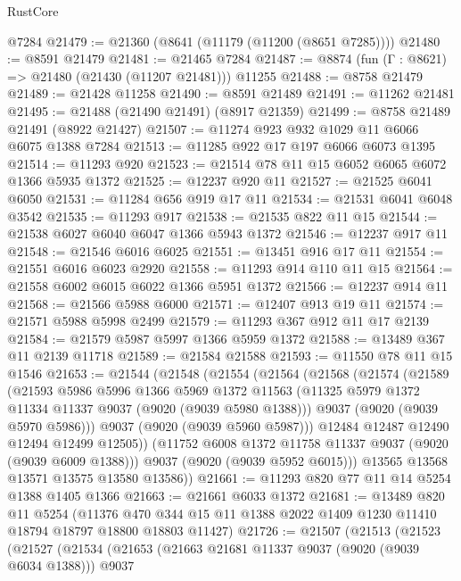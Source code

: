 \begin{lexlean}{RustCore}
\begin{coremodule}
    @7284
@21479 := @21360 (@8641 (@11179 (@11200 (@8651 @7285))))
@21480 := @8591 @21479
@21481 := @21465 @7284
@21487 := @8874 (fun (Γ : @8621) => @21480 (@21430 (@11207 @21481))) @11255
@21488 := @8758 @21479
@21489 := @21428 @11258
@21490 := @8591 @21489
@21491 := @11262 @21481
@21495 := @21488 (@21490 @21491) (@8917 @21359)
@21499 := @8758 @21489 @21491 (@8922 @21427)
@21507 := @11274 @923 @932 @1029 @11 @6066 @6075 @1388 @7284
@21513 := @11285 @922 @17 @197 @6066 @6073 @1395
@21514 := @11293 @920
@21523 := @21514 @78 @11 @15 @6052 @6065 @6072 @1366 @5935 @1372
@21525 := @12237 @920 @11
@21527 := @21525 @6041 @6050
@21531 := @11284 @656 @919 @17 @11
@21534 := @21531 @6041 @6048 @3542
@21535 := @11293 @917
@21538 := @21535 @822 @11 @15
@21544 := @21538 @6027 @6040 @6047 @1366 @5943 @1372
@21546 := @12237 @917 @11
@21548 := @21546 @6016 @6025
@21551 := @13451 @916 @17 @11
@21554 := @21551 @6016 @6023 @2920
@21558 := @11293 @914 @110 @11 @15
@21564 := @21558 @6002 @6015 @6022 @1366 @5951 @1372
@21566 := @12237 @914 @11
@21568 := @21566 @5988 @6000
@21571 := @12407 @913 @19 @11
@21574 := @21571 @5988 @5998 @2499
@21579 := @11293 @367 @912 @11 @17 @2139
@21584 := @21579 @5987 @5997 @1366 @5959 @1372
@21588 := @13489 @367 @11 @2139 @11718
@21589 := @21584 @21588
@21593 := @11550 @78 @11 @15 @1546
@21653 := @21544
    (@21548
      (@21554
        (@21564
          (@21568
            (@21574
              (@21589
                (@21593
                  @5986
                  @5996
                  @1366
                  @5969
                  @1372
                  @11563
                  (@11325 @5979 @1372 @11334 @11337 @9037 (@9020 (@9039 @5980 @1388)))
                  @9037
                  (@9020 (@9039 @5970 @5986)))
                @9037
                (@9020 (@9039 @5960 @5987)))
              @12484
              @12487
              @12490
              @12494
              @12499
              @12505))
          (@11752 @6008 @1372 @11758 @11337 @9037 (@9020 (@9039 @6009 @1388)))
          @9037
          (@9020 (@9039 @5952 @6015)))
        @13565
        @13568
        @13571
        @13575
        @13580
        @13586))
@21661 := @11293 @820 @77 @11 @14 @5254 @1388 @1405 @1366
@21663 := @21661 @6033 @1372
@21681 := @13489
    @820
    @11
    @5254
    (@11376 @470 @344 @15 @11 @1388 @2022 @1409 @1230 @11410 @18794 @18797 @18800 @18803 @11427)
@21726 := @21507
    (@21513
      (@21523
        (@21527
          (@21534
            (@21653
              (@21663 @21681 @11337 @9037 (@9020 (@9039 @6034 @1388)))
              @9037

\end{coremodule}
\end{lexlean}
